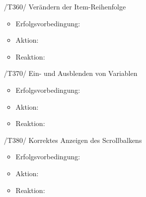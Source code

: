 \documentclass[parskip=full]{scrartcl}
\begin{document}
\begin{itemize}

	\item[/T360/] Verändern der Item-Reihenfolge
		\begin{itemize}
		\item Erfolgsvorbedingung:
		\item Aktion:
		\item Reaktion:		
		\end{itemize}	
	
	\item[/T370/] Ein- und Ausblenden von Variablen
		\begin{itemize}
		\item Erfolgsvorbedingung:
		\item Aktion:
		\item Reaktion:		
		\end{itemize}	
	
	\item[/T380/] Korrektes Anzeigen des Scrollbalkens
		\begin{itemize}
		\item Erfolgsvorbedingung:
		\item Aktion:
		\item Reaktion:		
		\end{itemize}	
	
\end{itemize}


\newpage
\end{document}
